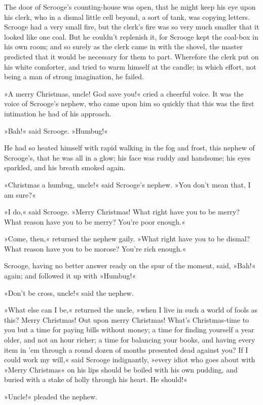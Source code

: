 The door of Scrooge's counting-house was open, that he might keep his eye upon his clerk, who in a dismal little cell beyond, a sort of tank, was copying letters. Scrooge had a very small fire, but the clerk's fire was so very much smaller that it looked like one coal. But he couldn't replenish it, for Scrooge kept the coal-box in his own room; and so surely as the clerk came in with the shovel, the master predicted that it would be necessary for them to part. Wherefore the clerk put on his white comforter, and tried to warm himself at the candle; in which effort, not being a man of strong imagination, he failed.

»A merry Christmas, uncle! God save you!« cried a cheerful voice. It was the voice of Scrooge's nephew, who came upon him so quickly that this was the first intimation he had of his approach.

»Bah!« said Scrooge. »Humbug!«

He had so heated himself with rapid walking in the fog and frost, this nephew of Scrooge's, that he was all in a glow; his face was ruddy and handsome; his eyes sparkled, and his breath smoked again.

»Christmas a humbug, uncle!« said Scrooge's nephew. »You don't mean that, I am sure?«

»I do,« said Scrooge. »Merry Christmas! What right have you to be merry? What reason have you to be merry? You're poor enough.«

»Come, then,« returned the nephew gaily. »What right have you to be dismal? What reason have you to be morose? You're rich enough.«

Scrooge, having no better answer ready on the spur of the moment, said, »Bah!« again; and followed it up with »Humbug!«

»Don't be cross, uncle!« said the nephew.

»What else can I be,« returned the uncle, »when I live in such a world of fools as this? Merry Christmas! Out upon merry Christmas! What's Christmas-time to you but a time for paying bills without money; a time for finding yourself a year older, and not an hour richer; a time for balancing your books, and having every item in 'em through a round dozen of months presented dead against you? If I could work my will,« said Scrooge indignantly, »every idiot who goes about with »Merry Christmas« on his lips should be boiled with his own pudding, and buried with a stake of holly through his heart. He should!«

»Uncle!« pleaded the nephew.

